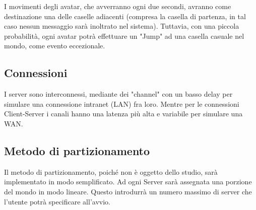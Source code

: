 \documentclass{article}
\begin{document}
I movimenti degli avatar, che avverranno ogni due secondi, avranno come
destinazione una delle caselle adiacenti (compresa la casella di partenza,
in tal caso nessun messaggio sarà inoltrato nel sistema). Tuttavia, con una
piccola probabilità, ogni avatar potrà effettuare un "Jump" ad una casella
casuale nel mondo, come evento eccezionale.

\subsection{Connessioni}
I server sono interconnessi, mediante dei "channel" con un basso delay
per simulare una connessione intranet (LAN) fra loro. Mentre per le connessioni
Client-Server i canali hanno una latenza più alta e variabile per 
simulare una WAN.

\subsection{Metodo di partizionamento}
Il metodo di partizionamento, poiché non è oggetto dello studio, sarà
implementato in modo semplificato. Ad ogni Server sarà assegnata una porzione
del mondo in modo lineare. Questo introdurrà un numero massimo di server che
l'utente potrà specificare all'avvio.
\end{document}
